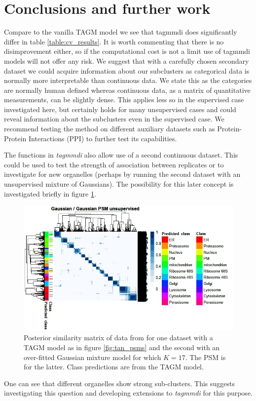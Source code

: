 \documentclass[11pt]{article} %
\begin{document}
\section{Conclusions and further work}
Compare to the vanilla TAGM model we see that tagmmdi does significantly differ in table \ref{table:cv_results}. It is worth commenting that there is no disimprovement either, so if the computational cost is not a limit use of tagmmdi models will not offer any risk. We suggest that with a carefully chosen secondary dataset we could acquire information about our subclusters as categorical data is normally more interpretable than continuous data. We state this as the categories are normally human defined whereas continuous data, as a matrix of quantitative measurements, can be slightly dense. This applies less so in the supervised case investigated here, but certainly holds for many unsupervised cases and could reveal information about the subclusters even in the supervised case. We recommend testing the method on different auxiliary datasets such as Protein-Protein Interactions (PPI) to further test its capabilities.

The functions in \emph{tagmmdi} also allow use of a second continuous dataset. This could be used to test the strength of association between replicates or to investigate for new organelles (perhaps by running the second dataset with an unsupervised mixture of Gaussians). The possibility for this later concept is investigated briefly in figure \ref{fig:g_g_psm}.

\begin{figure}[h]
\centering
\includegraphics[scale=0.9]{tan_tan_unsupervised_with_prediction_edit}
\caption{Posterior similarity matrix of data from \citet{TanMappingOrganelleProteins2009a} for one dataset with a TAGM model as in figure  \ref{fig:tan_psms} and the second with an over-fitted Gaussian mixture model for which $K=17$. The PSM is for the latter. Class predictions are from the TAGM model.}
\label{fig:g_g_psm}
\end{figure}
One can see that different organelles show strong sub-clusters. This suggests investigating this question and developing extensions to \emph{tagmmdi} for this purpose.
\end{document}
